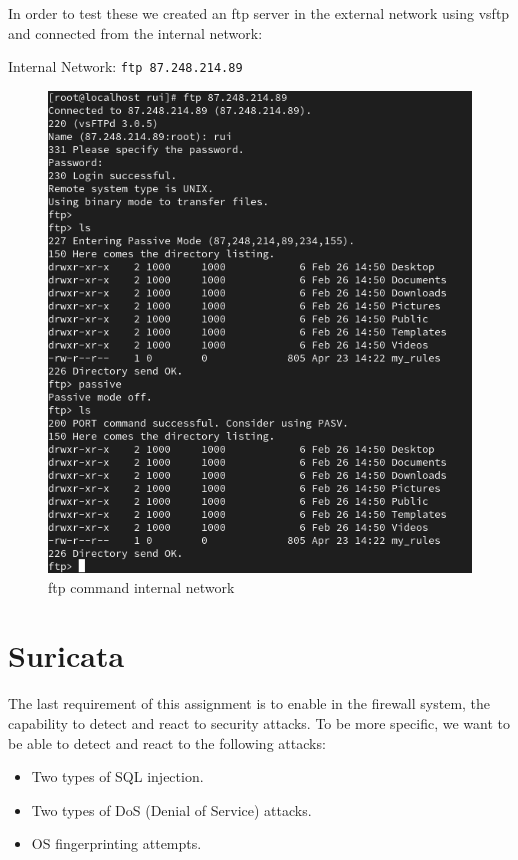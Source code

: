 \documentclass{article}
\begin{document}
In order to test these we created an ftp server in the external network using vsftp and connected from the internal network:\par
\texttt{}\par
Internal Network: \texttt{ftp 87.248.214.89} \par
\texttt{}\par
\begin{figure}[H]
    \centering
    \includegraphics[scale=0.5]{out/out_ftp_snat.png}
    \caption{ftp command internal network}
    \label{fig:network-arc}
\end{figure}




\section{Suricata}
\texttt{}\par The last requirement of this assignment is to enable in the firewall system, the capability to detect and react to security attacks. To be more specific, we want to be able to detect and react to the following attacks:
\begin{itemize}
    \item Two types of SQL injection.
    \item Two types of DoS (Denial of Service) attacks.
    \item OS fingerprinting attempts.
\end{itemize}
\end{document}

